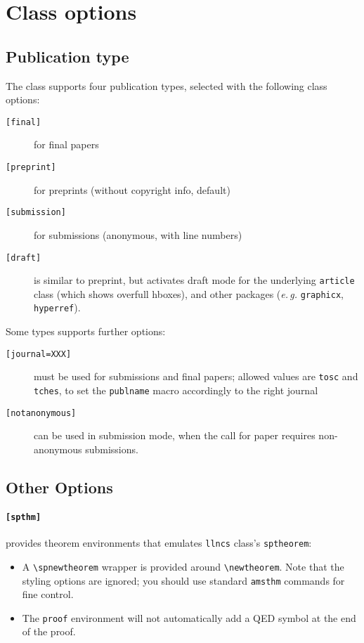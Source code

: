 \documentclass{iacrtrans}
\begin{document}
\section{Class options}
\label{sec:options}

\subsection{Publication type}

The class supports four publication types, selected with the
following class options:
\begin{description}
\item[\texttt{[final]}] for final papers
\item[\texttt{[preprint]}] for preprints (without copyright info, default)
\item[\texttt{[submission]}] for submissions (anonymous, with line numbers)
\item[\texttt{[draft]}] is similar to preprint, but activates draft
  mode for the underlying \texttt{article} class (which shows overfull hboxes), and other packages
  (\emph{e.\,g.} \texttt{graphicx}, \texttt{hyperref}).
\end{description}
Some types supports further options:
\begin{description}
\item[\texttt{[journal=XXX]}] must be used for submissions and
  final papers; allowed values are \texttt{tosc} and \texttt{tches},
  to set the \texttt{publname} macro accordingly to the right journal
\item[\texttt{[notanonymous]}] can be used in submission mode, when the
  call for paper requires non-anonymous submissions.
\end{description}

\subsection{Other Options}

\paragraph{\texttt{[spthm]}}
provides theorem environments that emulates
\texttt{llncs} class's \texttt{sptheorem}:
\begin{itemize}
\item A \texttt{\textbackslash spnewtheorem} wrapper is provided
  around \AmS{} \texttt{\textbackslash newtheorem}.  Note that the
  styling options are ignored; you should use standard
  \texttt{amsthm} commands for fine control.
\item The \AmS{} \texttt{proof} environment will not automatically add a
  QED symbol at the end of the proof.
\end{itemize}
\end{document}
